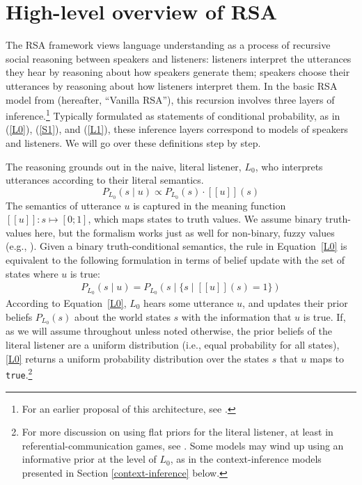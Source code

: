 \documentclass{sp}
\newcommand{\sem}[1]{\ensuremath{[\![#1]\!]}}
\begin{document}
\section{High-level overview of RSA} \label{overview}

The RSA framework views language understanding as a process of recursive social reasoning between speakers and listeners: listeners interpret the utterances they hear by reasoning about how speakers generate them; speakers choose their utterances by reasoning about how listeners interpret them. In the basic RSA model from \cite{frankgoodman2012} (hereafter, ``Vanilla RSA''), this recursion involves three layers of inference.\footnote{For an earlier proposal of this architecture, see \cite{BenzvanRooijOptimalAssertions2007}.} Typically formulated as statements of conditional probability, as in (\ref{L0}), (\ref{S1}), and (\ref{L1}), these inference layers correspond to models of speakers and listeners. We will go over these definitions step by step.

The reasoning grounds out in the naive, literal listener, $L_0$, who interprets utterances according to their literal semantics.
\begin{equation} \label{L0}
P_{L_0}(s \mid u) \propto P_{L_0}(s) \cdot \sem{u}(s)
\end{equation}
The semantics of utterance $u$ is captured in the meaning function $\sem{u} \colon s \mapsto [0;1]$, which maps states to truth values.
We assume binary truth-values here, but the formalism works just as well for non-binary, fuzzy values (e.g., \citealp{degenetal2020}).
Given a binary truth-conditional semantics, the rule in Equation~\eqref{L0} is equivalent to the following formulation in terms of belief update with the set of states where $u$ is true:
\begin{align}
  \label{eq:1}
  P_{L_{0}}(s \mid u) = P_{L_{0}}(s \mid \{ s \mid \sem{u}(s) = 1\})
\end{align}
According to Equation~\eqref{L0}, $L_0$ hears some utterance $u$, and updates their prior beliefs $P_{L_{0}}(s)$ about the world states $s$ with the information that $u$ is true.
If, as we will assume throughout unless noted otherwise, the prior beliefs of the literal listener are a uniform distribution (i.e., equal probability for all states), \eqref{L0} returns a uniform probability distribution over the states $s$ that $u$ maps to \texttt{true}.\footnote{For more discussion on using flat priors for the literal listener, at least in referential-communication games, see \cite{qingfranke2015}. Some models may wind up using an informative prior at the level of $L_0$, as in the context-inference models presented in Section \ref{context-inference} below.}
\end{document}
